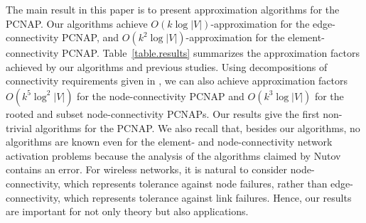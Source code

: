 \documentclass[11pt]{article}
\begin{document}
The main result in this paper is to present approximation algorithms for
the PCNAP.
Our algorithms achieve $O(k\log |V|)$-approximation for the
edge-connectivity PCNAP, and
$O(k^2 \log |V|)$-approximation for the element-connectivity PCNAP.
Table~\ref{table.results} summarizes the approximation factors achieved by our algorithms
and previous studies.
Using decompositions of connectivity requirements given in 
\cite{ChuzhoyK12,Nutov12uncrossable,Nutov12subset},
we can also achieve approximation factors
$O(k^5 \log^2 |V|)$ for the node-connectivity PCNAP
and $O(k^3 \log |V|)$ for the rooted and
subset node-connectivity PCNAPs.
Our results 
give the first non-trivial algorithms for the PCNAP.
We also recall that, 
besides our algorithms,
no algorithms are known
even for the element- and node-connectivity network activation problems
because the analysis of the algorithms claimed 
by Nutov~\cite{Nutov12uncrossable,Nutov13activation}
contains an error.
For wireless networks, it is natural to consider node-connectivity, 
which represents tolerance against node failures,
rather than edge-connectivity, which represents tolerance against link
failures.
Hence, our results are important for not only theory but also applications.
\end{document}
